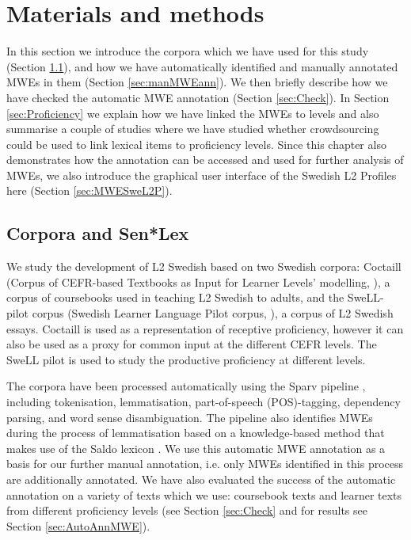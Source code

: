 \documentclass[output=paper,colorlinks,citecolor=brown]{langscibook}
\begin{document}
\section{Materials and methods}\label{sec:Materials}

In this section we introduce the corpora which we have used for this study (Section \ref{sec:CorporaSenLex}), and how we have automatically identified and manually annotated MWEs in them (Section \ref{sec:manMWEann}). We then briefly describe how we have checked the automatic MWE annotation 
(Section \ref{sec:Check}). In Section \ref{sec:Proficiency} we explain how we have linked the MWEs to levels and also summarise a couple of studies where we have studied whether crowdsourcing could be used to link lexical items to proficiency levels. Since this chapter also demonstrates how the annotation can be accessed and used for further analysis of MWEs, we also introduce the graphical user interface  of the Swedish L2 Profiles here (Section \ref{sec:MWESweL2P}). 

\subsection{Corpora and Sen*Lex}\label{sec:CorporaSenLex}
We study the development of L2 Swedish based on two Swedish corpora: 
Coctaill (Corpus of CEFR-based Textbooks as Input for Learner Levels' modelling, \cite{volodina2014you}), a corpus of coursebooks used in teaching L2 Swedish to adults,  
and  
the  SweLL-pilot corpus  (Swedish Learner Language Pilot corpus, \cite{volodina2016swell}), a corpus of L2 Swedish essays.
Coctaill is used as a representation of receptive proficiency, however it can also be used as a proxy for common input at the different CEFR levels. The SweLL pilot is used to study the productive proficiency at different levels.

\begin{sloppypar}
The corpora have been processed automatically using the Sparv pipeline \citep{borin2016sparv}, including tokenisation, lemmatisation, part-of-speech  (POS)-tagging, dependency parsing, and word sense disambiguation. The pipeline also identifies MWEs during the process of lemmatisation based on a knowledge-based method that makes use of the Saldo lexicon \citep{borin2013saldo}. We use this automatic MWE annotation as a basis for our further manual annotation, i.e. only MWEs identified in this process are additionally annotated. We have also evaluated the success of the automatic annotation on a variety of texts which we use: coursebook texts and learner texts from different proficiency levels (see Section \ref{sec:Check} and for results see Section \ref{sec:AutoAnnMWE}).
\end{sloppypar}
\end{document}
